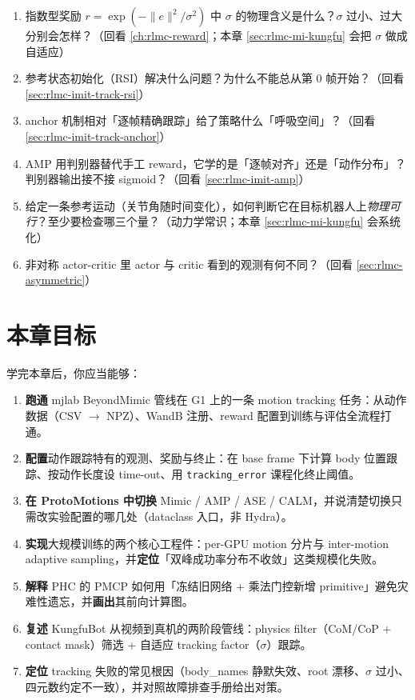 \begin{practice}
\begin{enumerate}
  \item 指数型奖励 $r=\exp(-\lVert e\rVert^2/\sigma^2)$ 中 $\sigma$ 的物理含义是什么？$\sigma$ 过小、过大分别会怎样？（回看 \cref{ch:rlmc-reward}；本章 \cref{sec:rlmc-mi-kungfu} 会把 $\sigma$ 做成自适应）
  \item 参考状态初始化（RSI）解决什么问题？为什么不能总从第 0 帧开始？（回看 \cref{sec:rlmc-imit-track-rsi}）
  \item anchor 机制相对「逐帧精确跟踪」给了策略什么「呼吸空间」？（回看 \cref{sec:rlmc-imit-track-anchor}）
  \item AMP 用判别器替代手工 reward，它学的是「逐帧对齐」还是「动作分布」？判别器输出接不接 sigmoid？（回看 \cref{sec:rlmc-imit-amp}）
  \item 给定一条参考运动（关节角随时间变化），如何判断它在目标机器人上\emph{物理可行}？至少要检查哪三个量？（动力学常识；本章 \cref{sec:rlmc-mi-kungfu} 会系统化）
  \item 非对称 actor-critic 里 actor 与 critic 看到的观测有何不同？（回看 \cref{sec:rlmc-asymmetric}）
\end{enumerate}
\end{practice}

\section*{本章目标}
\label{sec:rlmc-mi-goals}

学完本章后，你应当能够：

\begin{enumerate}
  \item \textbf{跑通} mjlab BeyondMimic 管线在 G1 上的一条 motion tracking 任务：从动作数据（CSV $\to$ NPZ）、WandB 注册、reward 配置到训练与评估全流程打通。
  \item \textbf{配置}动作跟踪特有的观测、奖励与终止：在 base frame 下计算 body 位置跟踪、按动作长度设 time-out、用 \verb|tracking_error| 课程化终止阈值。
  \item \textbf{在 ProtoMotions 中切换} Mimic / AMP / ASE / CALM，并说清楚切换只需改实验配置的哪几处（dataclass 入口，非 Hydra）。
  \item \textbf{实现}大规模训练的两个核心工程件：per-GPU motion 分片与 inter-motion adaptive sampling，并\textbf{定位}「双峰成功率分布不收敛」这类规模化失败。
  \item \textbf{解释} PHC 的 PMCP 如何用「冻结旧网络 + 乘法门控新增 primitive」避免灾难性遗忘，并\textbf{画出}其前向计算图。
  \item \textbf{复述} KungfuBot 从视频到真机的两阶段管线：physics filter（CoM/CoP + contact mask）筛选 + 自适应 tracking factor（$\sigma$）跟踪。
  \item \textbf{定位} tracking 失败的常见根因（body\_names 静默失效、root 漂移、$\sigma$ 过小、四元数约定不一致），并对照故障排查手册给出对策。
\end{enumerate}

